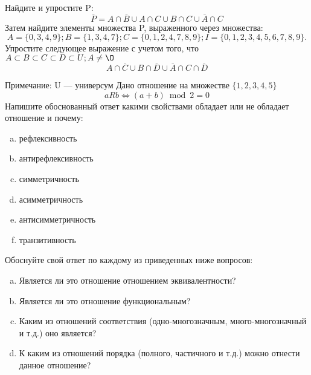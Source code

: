 \documentclass[10pt]{exam}
\begin{document}
\begin{questions}
\question
Найдите и упростите P:
\begin{equation*}
\overline{P} = A \cap \overline{B} \cup A \cap C \cup B \cap C \cup \overline{A} \cap C
\end{equation*}
Затем найдите элементы множества P, выраженного через множества:
\begin{equation*}
A = \{0, 3, 4, 9\}; 
B = \{1, 3, 4, 7\};
C = \{0, 1, 2, 4, 7, 8, 9\};
I = \{0, 1, 2, 3, 4, 5, 6, 7, 8, 9\}.
\end{equation*}\question
Упростите следующее выражение с учетом того, что $A\subset B \subset C \subset D \subset U; A \neq \O$
\begin{equation*}
A \cap  \overline{C} \cup B \cap \overline{D} \cup  \overline{A} \cap C \cap  \overline{D}
\end{equation*}

Примечание: U — универсум\question
Дано отношение на множестве $\{1, 2, 3, 4, 5\}$ 
\begin{equation*}
aRb \iff (a+b) \bmod 2 =0
\end{equation*}
Напишите обоснованный ответ какими свойствами обладает или не обладает отношение и почему:   
\begin{enumerate} [a)]\setcounter{enumi}{0}
\item рефлексивность
\item антирефлексивность
\item симметричность
\item асимметричность
\item антисимметричность
\item транзитивность
\end{enumerate}

Обоснуйте свой ответ по каждому из приведенных ниже вопросов:
\begin{enumerate} [a)]\setcounter{enumi}{0}
    \item Является ли это отношение отношением эквивалентности?
    \item Является ли это отношение функциональным?
    \item Каким из отношений соответствия (одно-многозначным, много-многозначный и т.д.) оно является?
    \item К каким из отношений порядка (полного, частичного и т.д.) можно отнести данное отношение?
\end{enumerate}




\end{questions}
\end{document}
